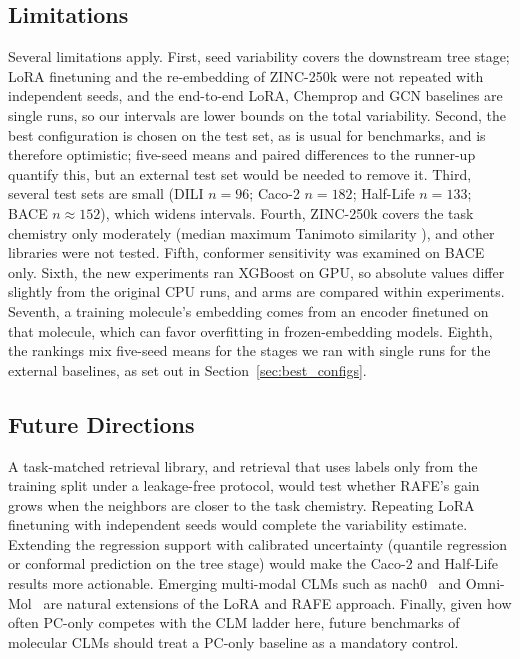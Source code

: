 \documentclass[pdflatex,sn-basic]{sn-jnl}%
\begin{document}
\subsection{Limitations}\label{sec:limitations}
Several limitations apply. First, seed variability covers the downstream tree stage; LoRA finetuning and the re-embedding of ZINC-250k were not repeated with independent seeds, and the end-to-end LoRA, Chemprop and GCN baselines are single runs, so our intervals are lower bounds on the total variability. Second, the best configuration is chosen on the test set, as is usual for benchmarks, and is therefore optimistic; five-seed means and paired differences to the runner-up quantify this, but an external test set would be needed to remove it. Third, several test sets are small (DILI $n=96$; Caco-2 $n=182$; Half-Life $n=133$; BACE $n\approx152$), which widens intervals. Fourth, ZINC-250k covers the task chemistry only moderately (median maximum Tanimoto similarity \covmedian{}), and other libraries were not tested. Fifth, conformer sensitivity was examined on BACE only. Sixth, the new experiments ran XGBoost on GPU, so absolute values differ slightly from the original CPU runs, and arms are compared within experiments. Seventh, a training molecule's embedding comes from an encoder finetuned on that molecule, which can favor overfitting in frozen-embedding models. Eighth, the rankings mix five-seed means for the stages we ran with single runs for the external baselines, as set out in Section~\ref{sec:best_configs}.

\subsection{Future Directions}\label{sec:future_work}
A task-matched retrieval library, and retrieval that uses labels only from the training split under a leakage-free protocol, would test whether RAFE's gain grows when the neighbors are closer to the task chemistry. Repeating LoRA finetuning with independent seeds would complete the variability estimate. Extending the regression support with calibrated uncertainty (quantile regression or conformal prediction on the tree stage) would make the Caco-2 and Half-Life results more actionable. Emerging multi-modal CLMs such as nach0~\cite{livne2024nach0} and Omni-Mol~\cite{hu2025omnimol} are natural extensions of the LoRA and RAFE approach. Finally, given how often PC-only competes with the CLM ladder here, future benchmarks of molecular CLMs should treat a PC-only baseline as a mandatory control.
\end{document}
